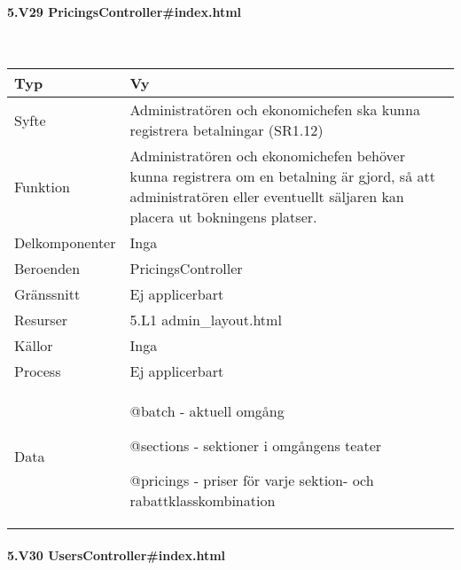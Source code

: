 \documentclass[a4paper, twoside, 11pt, titlepage]{article}
\begin{document}
			\paragraph{5.V29 PricingsController\#index.html}\

			\begin {table} [ht] \begin{tabular} {  p{3.5cm} p{9.6cm} }
				\hline
				{Typ} & {Vy} \\
				\hline
				{Syfte} & {Administratören och ekonomichefen ska kunna registrera betalningar (SR1.12)} \\
				\hline
				{Funktion} & {Administratören och ekonomichefen behöver kunna registrera om en betalning är gjord, så att administratören eller eventuellt säljaren kan placera ut bokningens platser.} \\
				\hline
				{Delkomponenter} & {Inga} \\
				\hline
				{Beroenden} & {PricingsController} \\
				\hline
				{Gränssnitt} & {Ej applicerbart} \\
				\hline
				{Resurser} & {5.L1 admin\_layout.html} \\
				\hline
				{Källor} & {Inga} \\
				\hline
				{Process} & {Ej applicerbart} \\
				\hline
				{Data} & {@batch - aktuell omgång

@sections - sektioner i omgångens teater

@pricings - priser för varje sektion- och rabattklasskombination} \\
				\hline
			\end{tabular} \end{table} \FloatBarrier


			\paragraph{5.V30 UsersController\#index.html}\
\end{document}
